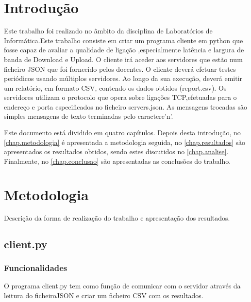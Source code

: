 \documentclass{report}
\begin{document}
\clearpage
{}

\chapter{Introdução}
\label{chap.introducao}

Este trabalho foi realizado no âmbito da disciplina de Laboratórios de Informática.Este trabalho consiste em criar um programa cliente em python que fosse capaz de avaliar a qualidade de ligação ,especialmente latência e largura de banda de Download e Upload.\newline
O cliente irá aceder aos servidores que estão num ficheiro \ac{JSON} que foi fornecido pelos docentes.\newline
O cliente deverá efetuar testes periódicos usando múltiplos servidores. Ao longo da sua execução, deverá emitir um relatório, em formato \ac{CSV}, contendo os dados obtidos (report.csv).\newline
Os servidores utilizam o protocolo que opera sobre ligações \ac{TCP},efetuadas para o endereço e porta especificados no ficheiro servers.json.\newline
As mensagens trocadas são simples mensagens de texto terminadas pelo caractere'n'. 

Este documento está dividido em quatro capítulos.
Depois desta introdução,
no \autoref{chap.metodologia} é apresentada a metodologia seguida,
no \autoref{chap.resultados} são apresentados os resultados obtidos,
sendo estes discutidos no \autoref{chap.analise}.
Finalmente, no \autoref{chap.conclusao} são apresentadas
as conclusões do trabalho.

\chapter{Metodologia}
\label{chap.metodologia}
Descrição da forma de realização do trabalho e apresentação dos resultados.

\section{client.py}

\subsection{Funcionalidades}
O programa client.py tem como função de comunicar com o servidor através da leitura do ficheiro\ac{JSON} e criar um ficheiro \ac{CSV} com os resultados.
\end{document}
